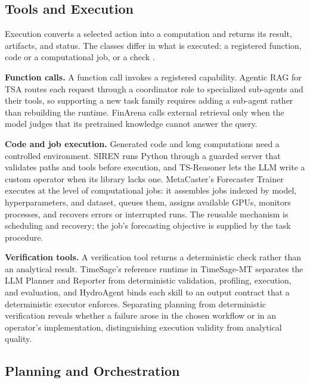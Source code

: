 \documentclass[preprints,article,submit,moreauthors]{Definitions/mdpi}
\begin{document}
\subsection{Tools and Execution}
\label{sec:gh-tools}

Execution converts a selected action into a computation and returns its result, artifacts, and status. The classes differ in what is executed: a registered function, code or a computational job, or a check \citep{ning2026codeharness}.

\noindent\textbf{Function calls.} A function call invokes a registered capability. Agentic RAG for TSA \citep{agenticrag2024} routes each request through a coordinator role to specialized sub-agents and their tools, so supporting a new task family requires adding a sub-agent rather than rebuilding the runtime. FinArena \citep{finarena2025} calls external retrieval only when the model judges that its pretrained knowledge cannot answer the query.

\noindent\textbf{Code and job execution.} Generated code and long computations need a controlled environment. SIREN \citep{siren2026} runs Python through a guarded server that validates paths and tools before execution, and TS-Reasoner \citep{tsreasoner2026} lets the LLM write a custom operator when its library lacks one. MetaCaster's Forecaster Trainer \citep{metacaster2026} executes at the level of computational jobs: it assembles jobs indexed by model, hyperparameters, and dataset, queues them, assigns available GPUs, monitors processes, and recovers errors or interrupted runs. The reusable mechanism is scheduling and recovery; the job's forecasting objective is supplied by the task procedure.

\noindent\textbf{Verification tools.} A verification tool returns a deterministic check rather than an analytical result. TimeSage's reference runtime in TimeSage-MT \citep{timesagemt2026} separates the LLM Planner and Reporter from deterministic validation, profiling, execution, and evaluation, and HydroAgent \citep{hydroagent2026} binds each skill to an output contract that a deterministic executor enforces. Separating planning from deterministic verification reveals whether a failure arose in the chosen workflow or in an operator's implementation, distinguishing execution validity from analytical quality.

\subsection{Planning and Orchestration}
\label{sec:gh-planning}
\end{document}
